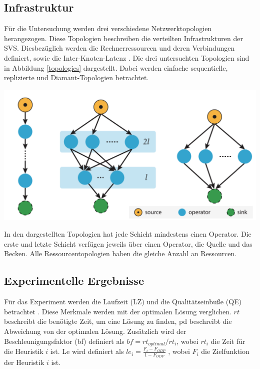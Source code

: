 \documentclass{article}
\begin{document}
\subsection{Infrastruktur}
Für die Untersuchung werden drei verschiedene Netzwerktopologien herangezogen. 
Diese Topologien beschreiben die verteilten Infrastrukturen der SVS. 
Diesbezüglich werden die Rechnerressourcen und deren Verbindungen definiert, sowie die Inter-Knoten-Latenz \cite{efficient-operator-placement}. 
Die drei untersuchten Topologien sind in Abbildung \ref{topologies} dargestellt. Dabei werden einfache sequentielle, replizierte und Diamant-Topologien betrachtet. \\

\noindent
\begin{minipage}{0.45\textwidth}
    \includegraphics[width=0.75\linewidth]{res/topologies.png}
\label{topologies}
\end{minipage}
\hspace{10pt}
\begin{minipage}{0.5\textwidth}
    In den dargestellten Topologien hat jede Schicht mindestens einen Operator. 
    Die erste und letzte Schicht verfügen jeweils über einen Operator, die Quelle und das Becken. 
    Alle Ressourcentopologien haben die gleiche Anzahl an Ressourcen.
\end{minipage}



\subsection{Experimentelle Ergebnisse}

Für das Experiment werden die Laufzeit (LZ) und die Qualitätseinbuße (QE) betrachtet \cite{efficient-operator-placement}.
Diese Merkmale werden mit der optimalen Lösung verglichen. $rt$ beschreibt die benötigte Zeit, 
um eine Lösung zu finden, pd beschreibt die Abweichung von der optimalen Lösung. 
Zusätzlich wird der Beschleunigungsfaktor (bf) definiert als $bf = rt_{optimal} / rt_i$, wobei $rt_i$ die Zeit für die Heuristik $i$ ist.
Le wird definiert als $le_i = \frac{F_i - F_{ODP}}{1 - F_{ODP}}$ \cite{efficient-operator-placement}, 
wobei $F_i$ die Zielfunktion der Heuristik $i$ ist.
\end{document}
